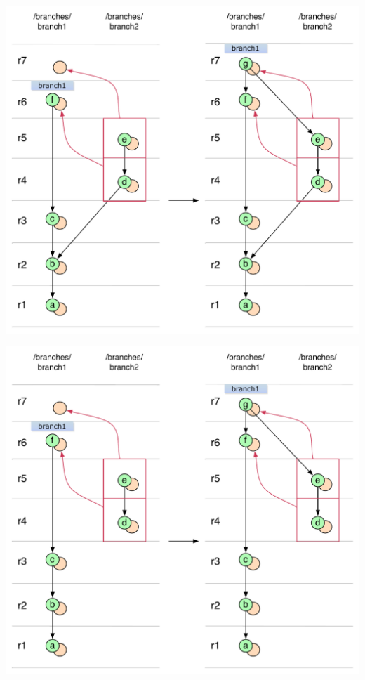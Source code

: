 \begin{center}
\includegraphics[width=\textwidth]{img/diagrams/merge_commit_on_double_cherry_pick_svn_to_git.pdf}%
\label{merge_commit_on_double_cherry_pick_svn_to_git}%
\end{center}

\begin{center}
\includegraphics[width=\textwidth]{img/diagrams/merge_commit_on_double_cherry_pick_branch_no_parent_svn_to_git.pdf}%
\label{merge_commit_on_double_cherry_pick_branch_no_parent_svn_to_git}%
\end{center}

